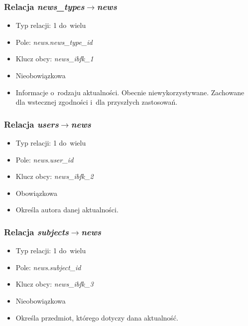 \documentclass[a4paper,12pt,oneside]{report}
\begin{document}
\subsubsection{Relacja \emph{news\_types}$\to$\emph{news}}
\label{subsub:news_types-news}
\begin{itemize}
  \item Typ relacji: 1 do~wielu
  \item Pole: \emph{news}.\emph{news\_type\_id}
  \item Klucz obcy: \emph{news\_ibfk\_1}
  \item Nieobowiązkowa
  \item Informacje o~rodzaju aktualności. Obecnie niewykorzystywane. Zachowane dla wstecznej zgodności i~dla przyszłych zastosowań.
\end{itemize}

\subsubsection{Relacja \emph{users}$\to$\emph{news}}
\label{subsub:users-news}
\begin{itemize}
  \item Typ relacji: 1 do~wielu
  \item Pole: \emph{news}.\emph{user\_id}
  \item Klucz obcy: \emph{news\_ibfk\_2}
  \item Obowiązkowa
  \item Określa autora danej aktualności.
\end{itemize}

\subsubsection{Relacja \emph{subjects}$\to$\emph{news}}
\label{subsub:subjects-news}
\begin{itemize}
  \item Typ relacji: 1 do~wielu
  \item Pole: \emph{news}.\emph{subject\_id}
  \item Klucz obcy: \emph{news\_ibfk\_3}
  \item Nieobowiązkowa
  \item Określa przedmiot, którego dotyczy dana aktualność.
\end{itemize}
\end{document}
